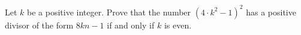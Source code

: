 Let $ k$ be a positive integer. Prove that the number $ (4 \cdot k^2 - 1)^2$ has a positive divisor of the form $ 8kn - 1$ if and only if $ k$ is even.
